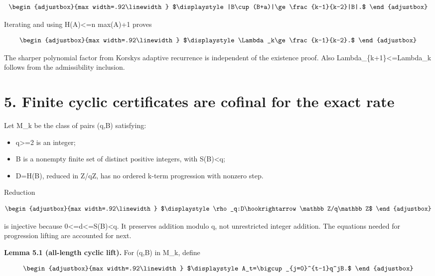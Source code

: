 \[
\begin{adjustbox}{max width=.92\linewidth}
$\displaystyle |B\cup(B+a)|\ge\frac{k-1}{k-2}|B|.$
\end{adjustbox}
\]

Iterating and using \textbar H(A)\textbar\textless=n max(A)+1 proves

\[
\begin{adjustbox}{max width=.92\linewidth}
$\displaystyle \Lambda_k\ge\frac{k-1}{k-2}.$
\end{adjustbox}
\]

The sharper polynomial factor from Korsky\textquotesingle s adaptive recurrence is independent of the existence proof. Also Lambda\_\{k+1\}\textless=Lambda\_k follows from the admissibility inclusion.

\section{5. Finite cyclic certificates are cofinal for the exact rate}\label{n02-finite-cyclic-certificates-are-cofinal-for-the-exact-rate}

Let M\_k be the class of pairs (q,B) satisfying:

\begin{itemize}
\tightlist
\item
  q\textgreater=2 is an integer;
\item
  B is a nonempty finite set of distinct positive integers, with S(B)\textless q;
\item
  D=H(B), reduced in Z/qZ, has no ordered k-term progression with nonzero step.
\end{itemize}

Reduction

\[
\begin{adjustbox}{max width=.92\linewidth}
$\displaystyle \rho_q:D\hookrightarrow\mathbb Z/q\mathbb Z$
\end{adjustbox}
\]

is injective because 0\textless=d\textless=S(B)\textless q. It preserves addition modulo q, not unrestricted integer addition. The equations needed for progression lifting are accounted for next.

\textbf{Lemma 5.1 (all-length cyclic lift).} For (q,B) in M\_k, define

\[
\begin{adjustbox}{max width=.92\linewidth}
$\displaystyle A_t=\bigcup_{j=0}^{t-1}q^jB.$
\end{adjustbox}
\]

